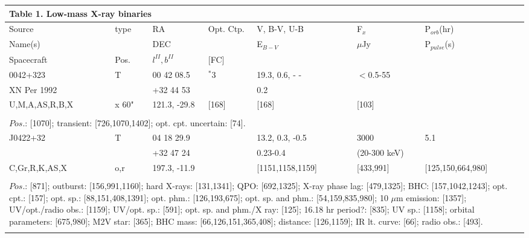 \documentclass{aa}
\begin{document}
\onecolumn

\begin{tabular}{p{2.5cm}p{1cm}p{1.8cm}p{2.3cm}p{3.3cm}p{2.0cm}p{2.2cm}}
\multicolumn{7}{p{17.5cm}}{Table 1.  Low-mass X-ray binaries}\\        
\hline

\noalign{\smallskip}
Source           & type  & RA                   & Opt. Ctp.  & V, B-V, U-B   & F$_{x}$    & P$_{orb}$(hr)  \\
Name(s)         &            & DEC                &                     & E$_{B-V}$    & $\mu$Jy  & P$_{pulse}$(s) \\
Spacecraft   & Pos.  & $l^{II}, b^{II}$  & [FC]           &                         &                    &     \\
\noalign{\smallskip} 
\hline

\noalign{\smallskip}
0042+323              & T               & 00 42 08.5         &  $^*$3                   & 19.3, 0.6, - -   & $<$0.5-55    &                  \\
XN Per 1992        &                   & +32 44 53          &                               & 0.2                  &                       &            \\
U,M,A,AS,R,B,X  &   x 60"       & 121.3, -29.8      & [168]                     & [168]              &  [103]            &    \\
\\
\multicolumn{7}{p{17.5cm}}{
$Pos$.: [1070]; transient: [726,1070,1402]; opt. cpt. uncertain: [74].}\\
\noalign{\smallskip}
\hline

\noalign{\smallskip}
J0422+32           &   T            & 04 18 29.9      &                      & 13.2, 0.3, -0.5              & 3000                & 5.1    \\                
                             &                 & +32 47 24        &                     & 0.23-0.4                        & (20-300 keV)  &     \\
C,Gr,R,K,AS,X  &  o,r          & 197.3, -11.9    &                      & [1151,1158,1159]       & [433,991]        & [125,150,664,980]    \\
  
\\
\multicolumn{7}{p{17.5cm}}{
$Pos$.: [871]; outburst: [156,991,1160]; hard X-rays: [131,1341]; QPO: [692,1325]; X-ray phase lag: [479,1325]; 
BHC: [157,1042,1243]; opt. cpt.: [157]; opt. sp.: [88,151,408,1391]; opt. phm.: [126,193,675]; opt. sp. and 
phm.: [54,159,835,980]; 10 $\mu$m emission: [1357]; UV/opt./radio obs.: [1159]; UV/opt. sp.: [591]; opt. sp. 
and phm./X ray: [125]; 16.18 hr period?: [835]; UV sp.: [1158]; orbital parameters: [675,980]; M2V star: [365]; 
BHC mass: [66,126,151,365,408]; distance: [126,1159]; IR lt. curve: [66]; radio obs.: [493].}\\
\noalign{\smallskip}
\hline


\end{tabular}
\end{document}
